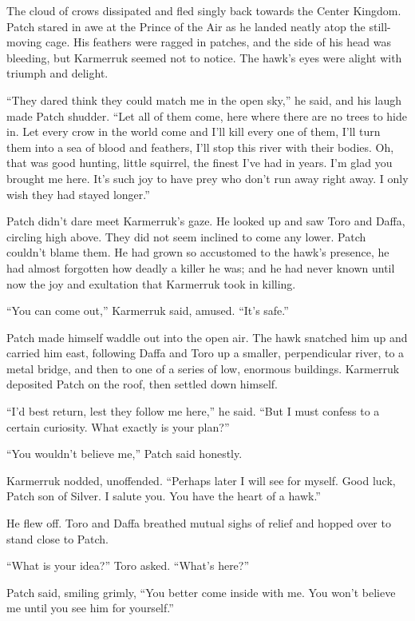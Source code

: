 \documentclass[ebook,oneside,openany,17pt]{memoir}
\newenvironment{tolerant}[1]{%
  \par\tolerance=#1\relax
}{%
  \par
}
\begin{document}
The cloud of crows dissipated and fled singly back towards the Center
Kingdom. Patch stared in awe at the Prince of the Air as he landed
neatly atop the still-moving cage. His feathers were ragged in
patches, and the side of his head was bleeding, but Karmerruk seemed
not to notice. The hawk’s eyes were alight with triumph and delight.

“They dared think they could match me in the open sky,” he said, and
his laugh made Patch shudder. “Let all of them come, here where there
are no trees to hide in. Let every crow in the world come and I’ll
kill every one of them, I’ll turn them into a sea of blood and
feathers, I’ll stop this river with their bodies. Oh, that was good
hunting, little squirrel, the finest I’ve had in years. I’m glad you
brought me here. It’s such joy to have prey who don’t run away right
away. I only wish they had stayed longer.”

\begin{tolerant}{500}
Patch didn’t dare meet Karmerruk’s gaze. He look\-ed up and saw Toro and
Daffa, circling high above. They did not seem inclined to come any
lower. Patch couldn’t blame them. He had grown so accustomed to the
hawk’s presence, he had almost forgotten how deadly a killer he was;
and he had never known until now the joy and exultation that Karmerruk
took in killing.
\end{tolerant}

“You can come out,” Karmerruk said, amused. “It’s safe.”

Patch made himself waddle out into the open air. The hawk snatched him
up and carried him east, following Daffa and Toro up a smaller,
perpendicular river, to a metal bridge, and then to one of a series of
low, enormous buildings. Karmerruk deposited Patch on the roof, then
settled down himself.

“I’d best return, lest they follow me here,” he said. “But I must
confess to a certain curiosity. What exactly is your plan?”

“You wouldn’t believe me,” Patch said honestly.

Karmerruk nodded, unoffended. “Perhaps later I will see for
myself. Good luck, Patch son of Silver. I salute you. You have the
heart of a hawk.”

He flew off. Toro and Daffa breathed mutual sighs of relief and hopped
over to stand close to Patch.

“What is your idea?” Toro asked. “What’s here?”

Patch said, smiling grimly, “You better come inside with me. You won’t
believe me until you see him for yourself.”
\end{document}
